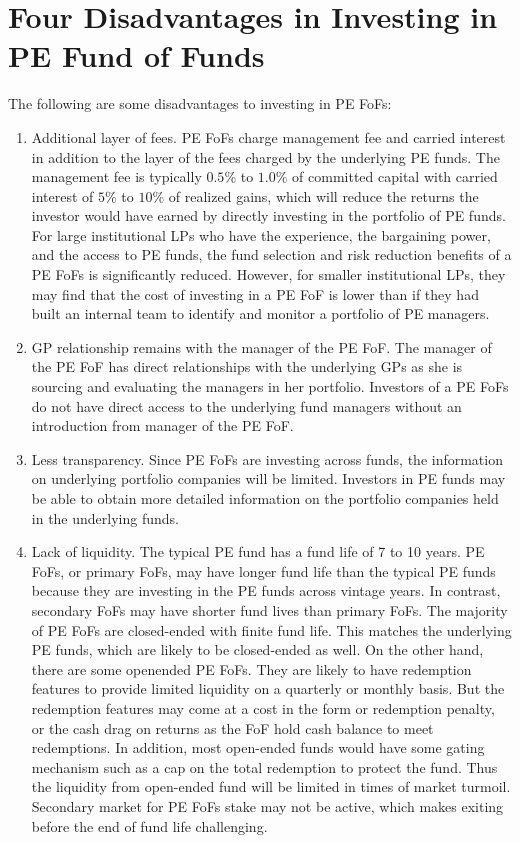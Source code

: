 \documentclass[11pt]{article}
\begin{document}
\section*{Four Disadvantages in Investing in PE Fund of Funds}
The following are some disadvantages to investing in PE FoFs:

\begin{enumerate}
  \item Additional layer of fees. PE FoFs charge management fee and carried interest in addition to the layer of the fees charged by the underlying PE funds. The management fee is typically $0.5 \%$ to $1.0 \%$ of committed capital with carried interest of $5 \%$ to $10 \%$ of realized gains, which will reduce the returns the investor would have earned by directly investing in the portfolio of PE funds. For large institutional LPs who have the experience, the bargaining power, and the access to PE funds, the fund selection and risk reduction benefits of a PE FoFs is significantly reduced. However, for smaller institutional LPs, they may find that the cost of investing in a PE FoF is lower than if they had built an internal team to identify and monitor a portfolio of PE managers.

  \item GP relationship remains with the manager of the PE FoF. The manager of the PE FoF has direct relationships with the underlying GPs as she is sourcing and evaluating the managers in her portfolio. Investors of a PE FoFs do not have direct access to the underlying fund managers without an introduction from manager of the PE FoF.

  \item Less transparency. Since PE FoFs are investing across funds, the information on underlying portfolio companies will be limited. Investors in PE funds may be able to obtain more detailed information on the portfolio companies held in the underlying funds.

  \item Lack of liquidity. The typical PE fund has a fund life of 7 to 10 years. PE FoFs, or primary FoFs, may have longer fund life than the typical PE funds because they are investing in the PE funds across vintage years. In contrast, secondary FoFs may have shorter fund lives than primary FoFs. The majority of PE FoFs are closed-ended with finite fund life. This matches the underlying PE funds, which are likely to be closed-ended as well. On the other hand, there are some openended PE FoFs. They are likely to have redemption features to provide limited liquidity on a quarterly or monthly basis. But the redemption features may come at a cost in the form or redemption penalty, or the cash drag on returns as the FoF hold cash balance to meet redemptions. In addition, most open-ended funds would have some gating mechanism such as a cap on the total redemption to protect the fund. Thus the liquidity from open-ended fund will be limited in times of market turmoil. Secondary market for PE FoFs stake may not be active, which makes exiting before the end of fund life challenging.

\end{enumerate}
\end{document}

